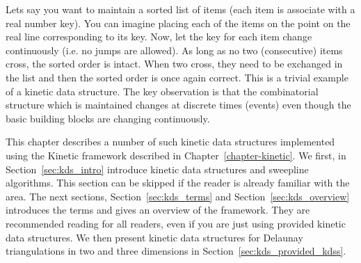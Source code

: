 



\begingroup
\minitoc



\def\note#1{$\langle\langle${\bf #1}$\rangle\rangle$}


%

Lets say you want to maintain a sorted list of items (each item is
associate with a real number key). You can imagine placing each of the
items on the point on the real line corresponding to its key. Now, let
the key for each item change continuously (i.e. no jumps are allowed).
As long as no two (consecutive) items cross, the sorted order is
intact. When two cross, they need to be exchanged in the list and then
the sorted order is once again correct. This is a trivial example of a
kinetic data structure. The key observation is that the combinatorial
structure which is maintained changes at discrete times (events) even
though the basic building blocks are changing continuously.

This chapter describes a number of such kinetic data structures
implemented using the Kinetic framework described in
Chapter~\ref{chapter-kinetic}. We first, in
Section~\ref{sec:kds_intro} introduce kinetic data structures and
sweepline algorithms. This section can be skipped if the reader is
already familiar with the area. The next sections,
Section~\ref{sec:kds_terms} and Section~\ref{sec:kds_overview} introduces
the terms and gives an overview of the framework. They are recommended
reading for all readers, even if you are just using provided kinetic
data structures. We then present kinetic data structures for Delaunay
triangulations in two and three dimensions in
Section~\ref{sec:kds_provided_kdss}.










\endgroup
